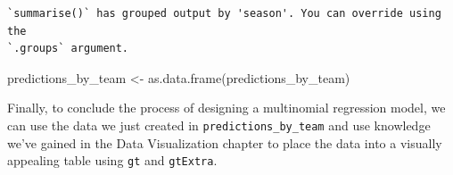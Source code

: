 \documentclass[
  letterpaper,
]{krantz}
\newenvironment{Shaded}{\begin{snugshade}}{\end{snugshade}}
\newcommand{\FunctionTok}[1]{\textcolor[rgb]{0.28,0.35,0.67}{#1}}
\newcommand{\NormalTok}[1]{\textcolor[rgb]{0.00,0.23,0.31}{#1}}
\newcommand{\OtherTok}[1]{\textcolor[rgb]{0.00,0.23,0.31}{#1}}
\begin{document}
\begin{verbatim}
`summarise()` has grouped output by 'season'. You can override using the
`.groups` argument.
\end{verbatim}

\begin{Shaded}
\begin{Highlighting}[]
\NormalTok{predictions\_by\_team }\OtherTok{\textless{}{-}} \FunctionTok{as.data.frame}\NormalTok{(predictions\_by\_team)}
\end{Highlighting}
\end{Shaded}

Finally, to conclude the process of designing a multinomial regression
model, we can use the data we just created in
\texttt{predictions\_by\_team} and use knowledge we've gained in the
Data Visualization chapter to place the data into a visually appealing
table using \texttt{gt} and \texttt{gtExtra}.
\end{document}
